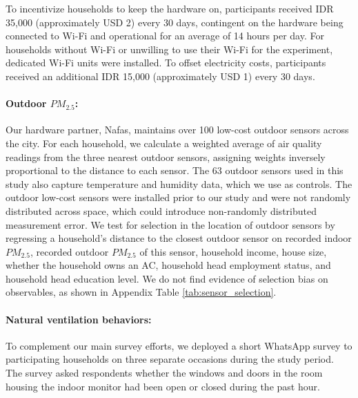 \documentclass[reqno,12pt,notitlepage]{article}
\begin{document}
To incentivize households to keep the hardware on, participants received IDR 35,000 (approximately USD 2) every 30 days, contingent on the hardware being connected to Wi-Fi and operational for an average of 14 hours per day. For households without Wi-Fi or unwilling to use their Wi-Fi for the experiment, dedicated Wi-Fi units were installed. To offset electricity costs, participants received an additional IDR 15,000 (approximately USD 1) every 30 days.

\paragraph{Outdoor $PM_{2.5}$:} Our hardware partner, Nafas, maintains over 100 low-cost outdoor sensors across the city. For each household, we calculate a weighted average of air quality readings from the three nearest outdoor sensors, assigning weights inversely proportional to the distance to each sensor. The 63 outdoor sensors used in this study also capture temperature and humidity data, which we use as controls. The outdoor low-cost sensors were installed prior to our study and were not randomly distributed across space, which could introduce non-randomly distributed measurement error. We test for selection in the location of outdoor sensors by regressing a household's distance to the closest outdoor sensor on recorded indoor $PM_{2.5}$, recorded outdoor $PM_{2.5}$ of this sensor, household income, house size, whether the household owns an AC, household head employment status, and household head education level. We do not find evidence of selection bias on observables, as shown in Appendix Table \ref{tab:sensor_selection}.

\paragraph{Natural ventilation behaviors:} To complement our main survey efforts, we deployed a short WhatsApp survey to participating households on three separate occasions during the study period. The survey asked respondents whether the windows and doors in the room housing the indoor monitor had been open or closed during the past hour.
\end{document}
